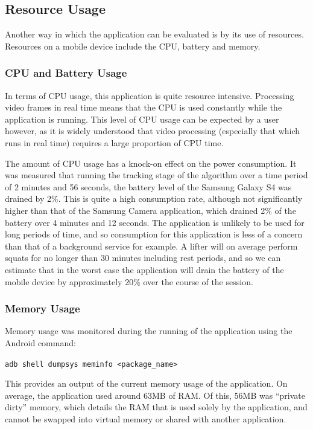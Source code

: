 \subsection{Resource Usage}

Another way in which the application can be evaluated is by its use of resources. Resources on a mobile device include the CPU, battery and memory.

\subsubsection{CPU and Battery Usage}
In terms of CPU usage, this application is quite resource intensive. Processing video frames in real time means that the CPU is used constantly while the application is running. This level of CPU usage can be expected by a user however, as it is widely understood that video processing (especially that which runs in real time) requires a large proportion of CPU time.

The amount of CPU usage has a knock-on effect on the power consumption. It was measured that running the tracking stage of the algorithm over a time period of 2 minutes and 56 seconds, the battery level of the Samsung Galaxy S4 was drained by 2\%. This is quite a high consumption rate, although not significantly higher than that of the Samsung Camera application, which drained 2\% of the battery over 4 minutes and 12 seconds. The application is unlikely to be used for long periods of time, and so consumption for this application is less of a concern than that of a background service for example. A lifter will on average perform squats for no longer than 30 minutes including rest periods, and so we can estimate that in the worst case the application will drain the battery of the mobile device by approximately 20\% over the course of the session.

\subsubsection{Memory Usage}
Memory usage was monitored during the running of the application using the Android command:

\texttt{adb shell dumpsys meminfo <package\_name>}

This provides an output of the current memory usage of the application. On average, the application used around 63MB of RAM. Of this, 56MB was ``private dirty'' memory, which details the RAM that is used solely by the application, and cannot be swapped into virtual memory or shared with another application.


